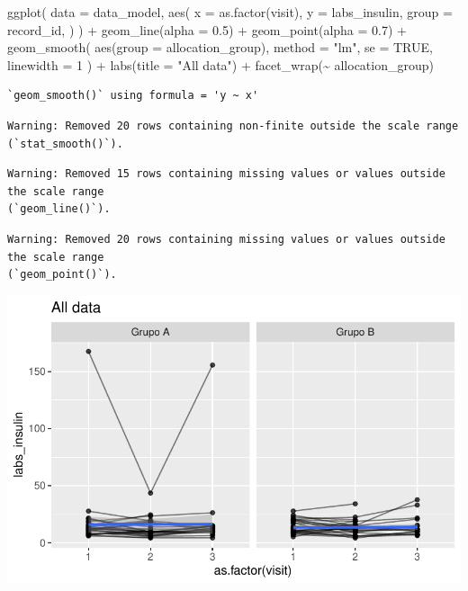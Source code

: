\documentclass[
  letterpaper,
  DIV=11,
  numbers=noendperiod]{scrartcl}
\newenvironment{Shaded}{\begin{snugshade}}{\end{snugshade}}
\newcommand{\AttributeTok}[1]{\textcolor[rgb]{0.40,0.45,0.13}{#1}}
\newcommand{\ConstantTok}[1]{\textcolor[rgb]{0.56,0.35,0.01}{#1}}
\newcommand{\DecValTok}[1]{\textcolor[rgb]{0.68,0.00,0.00}{#1}}
\newcommand{\FloatTok}[1]{\textcolor[rgb]{0.68,0.00,0.00}{#1}}
\newcommand{\FunctionTok}[1]{\textcolor[rgb]{0.28,0.35,0.67}{#1}}
\newcommand{\NormalTok}[1]{\textcolor[rgb]{0.00,0.23,0.31}{#1}}
\newcommand{\SpecialCharTok}[1]{\textcolor[rgb]{0.37,0.37,0.37}{#1}}
\newcommand{\StringTok}[1]{\textcolor[rgb]{0.13,0.47,0.30}{#1}}
\begin{document}
\begin{Shaded}
\begin{Highlighting}[]
\FunctionTok{ggplot}\NormalTok{(}
    \AttributeTok{data =}\NormalTok{ data\_model, }
    \FunctionTok{aes}\NormalTok{(}
        \AttributeTok{x =} \FunctionTok{as.factor}\NormalTok{(visit),}
        \AttributeTok{y =}\NormalTok{ labs\_insulin,}
        \AttributeTok{group =}\NormalTok{ record\_id,}
\NormalTok{    )}
\NormalTok{) }\SpecialCharTok{+}
    \FunctionTok{geom\_line}\NormalTok{(}\AttributeTok{alpha =} \FloatTok{0.5}\NormalTok{) }\SpecialCharTok{+}
    \FunctionTok{geom\_point}\NormalTok{(}\AttributeTok{alpha =} \FloatTok{0.7}\NormalTok{) }\SpecialCharTok{+}
    \FunctionTok{geom\_smooth}\NormalTok{(}
        \FunctionTok{aes}\NormalTok{(}\AttributeTok{group =}\NormalTok{ allocation\_group),}
        \AttributeTok{method =} \StringTok{"lm"}\NormalTok{,}
        \AttributeTok{se =} \ConstantTok{TRUE}\NormalTok{,}
        \AttributeTok{linewidth =} \DecValTok{1}
\NormalTok{    ) }\SpecialCharTok{+}
    \FunctionTok{labs}\NormalTok{(}\AttributeTok{title =} \StringTok{"All data"}\NormalTok{) }\SpecialCharTok{+}
    \FunctionTok{facet\_wrap}\NormalTok{(}\SpecialCharTok{\textasciitilde{}}\NormalTok{ allocation\_group) }
\end{Highlighting}
\end{Shaded}

\begin{verbatim}
`geom_smooth()` using formula = 'y ~ x'
\end{verbatim}

\begin{verbatim}
Warning: Removed 20 rows containing non-finite outside the scale range
(`stat_smooth()`).
\end{verbatim}

\begin{verbatim}
Warning: Removed 15 rows containing missing values or values outside the scale range
(`geom_line()`).
\end{verbatim}

\begin{verbatim}
Warning: Removed 20 rows containing missing values or values outside the scale range
(`geom_point()`).
\end{verbatim}

\includegraphics{Outcomes_V1V2V3_files/figure-pdf/labs_insulin_6-1.pdf}
\end{document}
